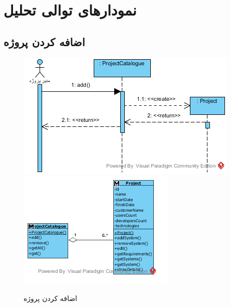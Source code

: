 \chapter{نمودارهای توالی تحلیل}
\section{اضافه کردن پروژه}
\begin{figure}[H]
	\centering
	\includegraphics[scale=0.9]{img/sequence-analysis/AddProjectToOrganization}
	\includegraphics[scale=0.9]{img/sequence-analysis/AddProjectToOrganizationC}
	\caption{اضافه کردن پروژه}
\end{figure}

